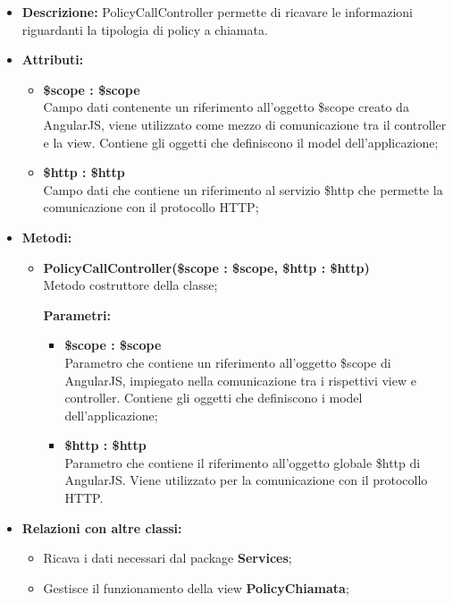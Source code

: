 \begin{itemize}
	\item \textbf{Descrizione:} PolicyCallController permette di ricavare le informazioni riguardanti la tipologia di policy a chiamata.
	\item \textbf{Attributi:}
	\begin{itemize}
		
		\item \textbf{\$scope : \$scope}\\
		Campo dati contenente un riferimento all'oggetto \$scope creato da AngularJS, viene utilizzato come mezzo di comunicazione tra il controller e la view. Contiene gli oggetti che definiscono il model dell'applicazione;
		
		\item \textbf{\$http : \$http }\\
		Campo dati che contiene un riferimento al servizio \$http che permette la comunicazione con il protocollo HTTP;
		
	\end{itemize}
	\item \textbf{Metodi:}
	\begin{itemize}
		
		\item \textbf{PolicyCallController(\$scope : \$scope, \$http : \$http)}\\
		Metodo costruttore della classe;
		\begin{description}
			\item[\textbf{Parametri:}]
		\end{description}
		\begin{itemize}
			\item \textbf{\$scope : \$scope}\\
			Parametro che contiene un riferimento all'oggetto \$scope di AngularJS, impiegato nella comunicazione tra i rispettivi view e controller. Contiene gli oggetti che definiscono i model dell'applicazione;
			
			\item \textbf{\$http : \$http}\\
			Parametro che contiene il riferimento all'oggetto globale \$http di AngularJS. Viene utilizzato per la comunicazione con il protocollo HTTP.
			
		\end{itemize}				
	\end{itemize}
	\item \textbf{Relazioni con altre classi:}
	\begin{itemize}
		\item Ricava i dati necessari dal package \textbf{Services};
		\item Gestisce il funzionamento della view \textbf{PolicyChiamata};
	\end{itemize}
\end{itemize}

